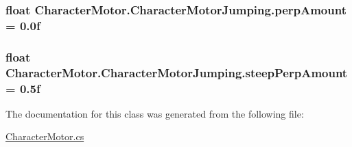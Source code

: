 \subsubsection[{perp\+Amount}]{\setlength{\rightskip}{0pt plus 5cm}float Character\+Motor.\+Character\+Motor\+Jumping.\+perp\+Amount = 0.\+0f}\label{class_character_motor_1_1_character_motor_jumping_ae234d27fc10de24027da0f635f076d9f}
\hypertarget{class_character_motor_1_1_character_motor_jumping_a555ce2e43e9c5f121139647afe909f81}{}
\subsubsection[{steep\+Perp\+Amount}]{\setlength{\rightskip}{0pt plus 5cm}float Character\+Motor.\+Character\+Motor\+Jumping.\+steep\+Perp\+Amount = 0.\+5f}\label{class_character_motor_1_1_character_motor_jumping_a555ce2e43e9c5f121139647afe909f81}


The documentation for this class was generated from the following file\+:\begin{DoxyCompactItemize}
\item 
\hyperlink{_character_motor_8cs}{Character\+Motor.\+cs}\end{DoxyCompactItemize}

